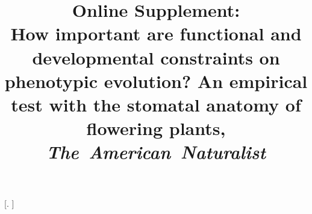 \usepackage[sc]{mathpazo} %
\usepackage{fullpage}
\usepackage[authoryear,sectionbib,sort]{natbib}
\linespread{1.7}
\usepackage[utf8]{inputenc}
\usepackage{lineno}
\usepackage{titlesec}
\titleformat{\section}[block]{\Large\bfseries\filcenter}{\thesection}{1em}{}
\titleformat{\subsection}[block]{\Large\itshape\filcenter}{\thesubsection}{1em}{}
\titleformat{\subsubsection}[block]{\large\itshape}{\thesubsubsection}{1em}{}
\titleformat{\paragraph}[runin]{\itshape}{\theparagraph}{1em}{}[. ]
\usepackage{fancyhdr}
\pagestyle{fancy}
\usepackage{multirow} %
\usepackage{caption} %
\usepackage{nopageno} %

%
%
\setlength{\headsep}{0.3in}  
\lhead{} 

%
%
%

\title{Online Supplement: \\ 
How important are functional and developmental constraints on phenotypic evolution? An empirical test with the stomatal anatomy of flowering plants, \\ 
\textit{The~American~Naturalist} }

